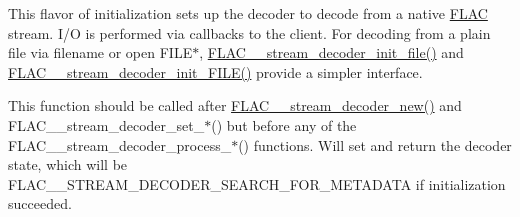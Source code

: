 This flavor of initialization sets up the decoder to decode from a native \hyperlink{namespace_f_l_a_c}{F\+L\+AC} stream. I/O is performed via callbacks to the client. For decoding from a plain file via filename or open F\+I\+L\+E$\ast$, \hyperlink{group__flac__stream__decoder_ga1692108a97012d1c5f79baf7df012c33}{F\+L\+A\+C\+\_\+\+\_\+stream\+\_\+decoder\+\_\+init\+\_\+file()} and \hyperlink{group__flac__stream__decoder_ga38f9eb46bf112af205f86b4cbac9980c}{F\+L\+A\+C\+\_\+\+\_\+stream\+\_\+decoder\+\_\+init\+\_\+\+F\+I\+L\+E()} provide a simpler interface.

This function should be called after \hyperlink{group__flac__stream__decoder_ga7159eefc074dfbab4a37462f69326091}{F\+L\+A\+C\+\_\+\+\_\+stream\+\_\+decoder\+\_\+new()} and F\+L\+A\+C\+\_\+\+\_\+stream\+\_\+decoder\+\_\+set\+\_\+$\ast$() but before any of the F\+L\+A\+C\+\_\+\+\_\+stream\+\_\+decoder\+\_\+process\+\_\+$\ast$() functions. Will set and return the decoder state, which will be F\+L\+A\+C\+\_\+\+\_\+\+S\+T\+R\+E\+A\+M\+\_\+\+D\+E\+C\+O\+D\+E\+R\+\_\+\+S\+E\+A\+R\+C\+H\+\_\+\+F\+O\+R\+\_\+\+M\+E\+T\+A\+D\+A\+TA if initialization succeeded.


